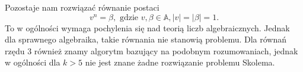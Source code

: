 \documentclass[leqno,10pt]{article}
\def\A{\mathbb{A}}
\begin{document}
Pozostaje nam rozwiązać równanie postaci
\begin{equation*}
    v^{n} = \beta, \text{ gdzie } v, \beta \in \A, |v| = |\beta| = 1.
\end{equation*}
To w ogólności wymaga pochylenia się nad teorią liczb algebraicznych. Jednak dla sprawnego algebraika, takie równania nie stanowią problemu. Dla równań rzędu $3$ również znamy algorytm bazujący na podobnym rozumowaniach, jednak w ogólności dla $k>5$ nie jest znane żadne rozwiązanie problemu Skolema. 






\end{document}
